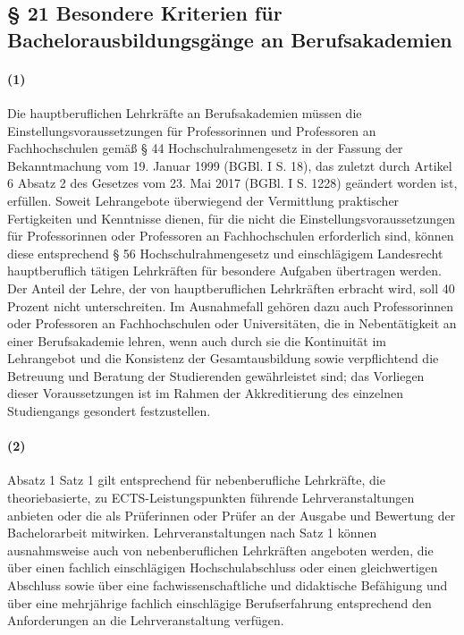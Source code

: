 \documentclass[a4paper]{scrartcl}
\begin{document}
\subsection{§ 21 Besondere Kriterien für Bachelorausbildungsgänge an
Berufsakademien}
\paragraph{(1)} Die hauptberuflichen Lehrkräfte an Berufsakademien müssen die Einstellungsvoraussetzungen für Professorinnen und Professoren an Fachhochschulen gemäß § 44 Hochschulrahmengesetz in der Fassung der Bekanntmachung vom 19. Januar 1999 (BGBl. I S. 18), das zuletzt durch Artikel 6 Absatz 2 des Gesetzes vom 23. Mai 2017 (BGBl. I S. 1228) geändert worden ist, erfüllen. Soweit Lehrangebote überwiegend der Vermittlung praktischer Fertigkeiten und Kenntnisse dienen, für die nicht die Einstellungsvoraussetzungen für Professorinnen oder Professoren an Fachhochschulen erforderlich sind, können diese entsprechend § 56 Hochschulrahmengesetz und einschlägigem Landesrecht hauptberuflich tätigen Lehrkräften für besondere Aufgaben übertragen werden. Der Anteil der Lehre, der von hauptberuflichen Lehrkräften erbracht wird, soll 40 Prozent nicht unterschreiten. Im Ausnahmefall gehören dazu auch Professorinnen oder Professoren an Fachhochschulen oder Universitäten, die in Nebentätigkeit an einer Berufsakademie lehren, wenn auch durch sie die Kontinuität im Lehrangebot und die Konsistenz der Gesamtausbildung sowie verpflichtend die Betreuung und Beratung der Studierenden gewährleistet sind; das Vorliegen dieser Voraussetzungen ist im Rahmen der Akkreditierung des einzelnen Studiengangs gesondert festzustellen.
\paragraph{(2)} Absatz 1 Satz 1 gilt entsprechend für nebenberufliche Lehrkräfte, die
theoriebasierte, zu ECTS-Leistungspunkten führende Lehrveranstaltungen anbieten oder die als Prüferinnen oder Prüfer an der Ausgabe und Bewertung der Bachelorarbeit mitwirken.
Lehrveranstaltungen nach Satz 1 können ausnahmsweise auch von nebenberuflichen Lehrkräften angeboten werden, die über einen fachlich einschlägigen Hochschulabschluss oder einen gleichwertigen Abschluss sowie über eine fachwissenschaftliche und didaktische Befähigung und über eine mehrjährige fachlich einschlägige Berufserfahrung entsprechend den Anforderungen an die Lehrveranstaltung verfügen.
\end{document}
